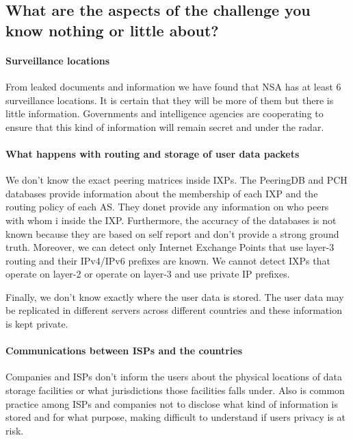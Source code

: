 \subsection{What are the aspects of the challenge you know nothing or little 
about?}

\paragraph{Surveillance locations}

From leaked documents and information we have found that NSA has at least 6 
surveillance locations. It is certain that they will be more of them but there 
is little information. Governments and intelligence agencies are cooperating to 
ensure that this kind of information will remain secret and under the radar.

\paragraph{What happens with routing and storage of user data packets}

We don't know the exact peering matrices inside IXPs. The PeeringDB and PCH 
databases provide information about the membership of each IXP and the routing 
policy of each AS. They don¢t provide any information on who peers with whom i
inside the IXP. Furthermore, the accuracy of the databases is not known because 
they are based on self report and don't provide a strong ground truth. Moreover, 
we can detect only Internet Exchange Points that use layer-3 routing and their 
IPv4/IPv6 prefixes are known. We cannot detect IXPs that operate on layer-2 or 
operate on layer-3 and use private IP prefixes. 

Finally, we don't know exactly where the user data is stored. The user data may 
be replicated in different servers across different countries and these 
information is kept private.

\paragraph{Communications between ISPs and the countries}
Companies and ISPs don't inform the users about the physical locations of data 
storage facilities or what jurisdictions those facilities falls under. Also is 
common practice among ISPs and companies not to disclose what kind of 
information is stored and for what purpose, making difficult to understand if 
users privacy is at risk.

